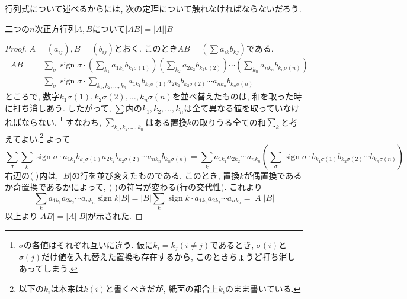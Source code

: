 \documentclass[a4j,dvipdfmx]{jsarticle}
\numberwithin{equation}{section}
\newcommand{\sign}{\mathop{\mathrm{sign}}\nolimits}
\begin{document}
            行列式について述べるからには, 次の定理について触れなければならないだろう.
            \begin{screen}
                二つの$n$次正方行列$A,B$について$|AB|=|A||B|$
            \end{screen}
            \begin{proof}
                $A=(a_{ij}),B=(b_{ij})$とおく. このとき$AB=(\sum a_{ik}b_{kj})$である.
                \begin{align*}
                    |AB|&=\sum_{\sigma}\sign\sigma\cdot \left(\sum_{k_1}a_{1k_1}b_{k_1\sigma(1)}\right)\left(\sum_{k_2}a_{2k_2}b_{k_2\sigma(2)}\right)\cdots\left(\sum_{k_n}a_{nk_n}b_{k_n\sigma(n)}\right)\\
                    &=\sum_{\sigma}\sign\sigma\cdot \sum_{k_1,k_2,\dots,k_n}a_{1k_1}b_{k_1\sigma(1)}a_{2k_2}b_{k_2\sigma(2)}\cdots a_{nk_n}b_{k_n\sigma(n)}
                \end{align*}
                ところで, 数字$k_1\sigma(1),k_2\sigma(2),\dots,k_n\sigma(n)$を並べ替えたものは, 和を取った時に打ち消しあう. したがって, $\sum$内の$k_1,k_2,\dots,k_n$は全て異なる値を取っていなければならない.
                \footnote{$\sigma$の各値はそれぞれ互いに違う. 仮に$k_i=k_j(i\neq j)$であるとき, $\sigma(i)$と$\sigma(j)$だけ値を入れ替えた置換も存在するから, このときちょうど打ち消しあってしまう.}
                すなわち, $\sum\limits_{k_1,k_2,\dots,k_n}$はある置換$k$の取りうる全ての和$\sum\limits_{k}$と考えてよい.\footnote{以下の$k_i$は本来は$k(i)$と書くべきだが, 紙面の都合上$k_i$のまま書いている.}  よって
                \begin{equation*}
                    \sum_{\sigma}\sum_{k}\sign\sigma\cdot a_{1k_1}b_{k_1\sigma(1)}a_{2k_2}b_{k_2\sigma(2)}\cdots a_{nk_n}b_{k_n\sigma(n)}=\sum_{k}a_{1k_1}a_{2k_2}\cdots a_{nk_n}\left(\sum_{\sigma}\sign \sigma\cdot b_{k_1\sigma(1)}b_{k_2\sigma(2)}\cdots b_{k_n\sigma(n)}\right)
                \end{equation*}
                右辺の$(\hspace{1mm})$内は, $|B|$の行を並び変えたものである. このとき, 置換$k$が偶置換であるか奇置換であるかによって, $(\hspace{1mm})$の符号が変わる(行の交代性). これより
                \begin{equation*}
                    \sum_{k}a_{1k_1}a_{2k_2}\cdots a_{nk_n}\sign k|B|=|B|\sum_{k}\sign k\cdot a_{1k_1}a_{2k_2}\cdots a_{nk_n}=|A||B|
                \end{equation*} 
                以上より$|AB|=|A||B|$が示された.
            \end{proof}
\end{document}
